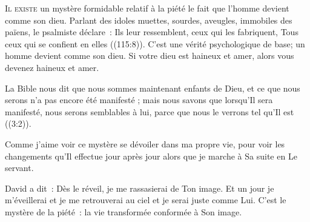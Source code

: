 


\lettrine{I}{l existe} un mystère formidable relatif à la piété
 \ocadr le fait que l'homme devient comme son dieu.
 Parlant des idoles muettes, sourdes, aveugles, immobiles des païens,
 le psalmiste déclare~: 
 \og Ils leur ressemblent, ceux qui les fabriquent,
 Tous ceux qui se confient en elles \fg{} ((115:8)).
 C'est une vérité psychologique de base;
 un homme devient comme son dieu.
 Si votre dieu est haineux et amer, alors vous devenez haineux et amer.


La Bible nous dit que \og nous 
 sommes maintenant enfants de Dieu, et ce que nous serons n'a pas encore
 été manifesté ; mais nous savons que lorsqu'Il sera manifesté,
 nous serons semblables à lui, parce que nous le verrons
 tel qu'Il est \fg{} ((3:2)).

Comme j'aime voir ce mystère se dévoiler dans ma propre vie,
 pour voir les changements qu'Il effectue jour après jour
 alors que je marche à Sa suite en Le servant.

David a dit~: 
 \og Dès le réveil, je me rassasierai de Ton image. \fg{}
 Et un jour je m'éveillerai et je me retrouverai au ciel
 et je serai juste comme Lui. C'est le mystère de la piété~:
 la vie transformée conformée à Son image.

\dvrule






